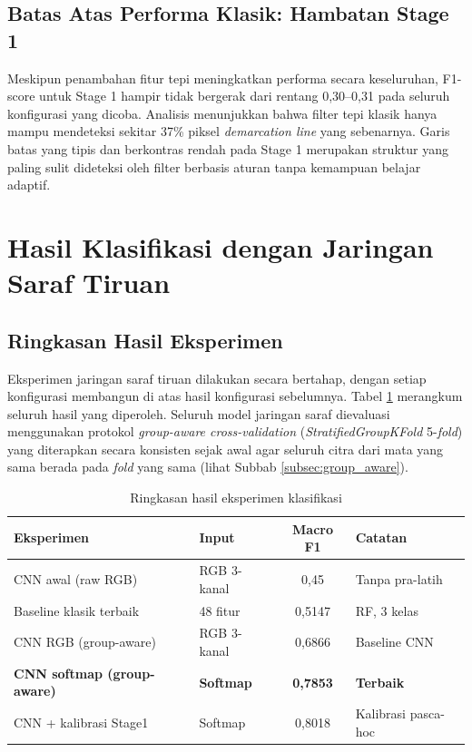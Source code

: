 \subsection{Batas Atas Performa Klasik: Hambatan Stage 1}

Meskipun penambahan fitur tepi meningkatkan performa secara keseluruhan, F1-score untuk Stage
1 hampir tidak bergerak dari rentang 0,30--0,31 pada seluruh konfigurasi yang dicoba. Analisis
menunjukkan bahwa filter tepi klasik hanya mampu mendeteksi sekitar 37\% piksel \textit{demarcation
line} yang sebenarnya. Garis batas yang tipis dan berkontras rendah pada Stage 1 merupakan
struktur yang paling sulit dideteksi oleh filter berbasis aturan tanpa kemampuan belajar
adaptif.

\section{Hasil Klasifikasi dengan Jaringan Saraf Tiruan}

\subsection{Ringkasan Hasil Eksperimen}

Eksperimen jaringan saraf tiruan dilakukan secara bertahap, dengan setiap konfigurasi
membangun di atas hasil konfigurasi sebelumnya. Tabel \ref{tab:hasil_keseluruhan} merangkum
seluruh hasil yang diperoleh. Seluruh model jaringan saraf dievaluasi menggunakan protokol
\textit{group-aware cross-validation} (\textit{StratifiedGroupKFold} 5-\textit{fold}) yang
diterapkan secara konsisten sejak awal agar seluruh citra dari mata yang sama berada pada
\textit{fold} yang sama (lihat Subbab \ref{subsec:group_aware}).

\begin{table}[H]
\centering
\caption{Ringkasan hasil eksperimen klasifikasi}
\label{tab:hasil_keseluruhan}
\begin{tabular}{l l c l}
\toprule
\textbf{Eksperimen} & \textbf{Input} & \textbf{Macro F1} & \textbf{Catatan} \\
\midrule
CNN awal (raw RGB)          & RGB 3-kanal & 0,45  & Tanpa pra-latih \\
Baseline klasik terbaik     & 48 fitur    & 0,5147 & RF, 3 kelas \\
CNN RGB (group-aware)       & RGB 3-kanal & 0,6866 & Baseline CNN \\
\textbf{CNN softmap (group-aware)} & \textbf{Softmap} & \textbf{0,7853} & \textbf{Terbaik} \\
CNN + kalibrasi Stage1      & Softmap     & 0,8018 & Kalibrasi pasca-hoc \\
\bottomrule
\end{tabular}
\end{table}

